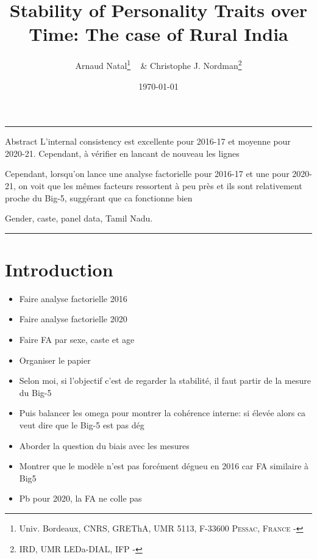 \documentclass[a4paper, 12pt, onecolumn]{article}
\title{Stability of Personality Traits over Time: The case of Rural India}
\author{Arnaud Natal\thanks{Univ. Bordeaux, CNRS, GREThA, UMR 5113, F-33600 \textsc{Pessac, France} - \email{arnaud.natal@u-bordeaux.fr}} ~ \& Christophe J. Nordman\thanks{IRD, UMR LEDa-DIAL, IFP - \email{nordman@dial.prd}} }
\date{\today}
\begin{document}
\maketitle

\hrule 
\vspace{0.3cm}

\begin{resab}{Abstract}
L'internal consistency est excellente pour 2016-17 et moyenne pour 2020-21.
Cependant, à vérifier en lancant de nouveau les lignes

Cependant, lorsqu'on lance une analyse factorielle pour 2016-17 et une pour 2020-21, on voit que les mêmes facteurs ressortent à peu près et ils sont relativement proche du Big-5, suggérant que ca fonctionne bien


\end{resab}

\begin{keywords}
Gender, caste, panel data, Tamil Nadu.
\end{keywords}

\begin{jelcodes}
\end{jelcodes}

\hrule

\clearpage
\newpage
\section{Introduction}
\label{Introduction}

\begin{itemize}
\item Faire analyse factorielle 2016
\item Faire analyse factorielle 2020
\item Faire FA par sexe, caste et age
\item Organiser le papier
\item Selon moi, si l'objectif c'est de regarder la stabilité, il faut partir de la mesure du Big-5
\item Puis balancer les omega pour montrer la cohérence interne: si élevée alors ca veut dire que le Big-5 est pas dég
\item Aborder la question du biais avec les mesures
\item Montrer que le modèle n'est pas forcément dégueu en 2016 car FA similaire à Big5
\item Pb pour 2020, la FA ne colle pas 
\end{itemize}
\end{document}
